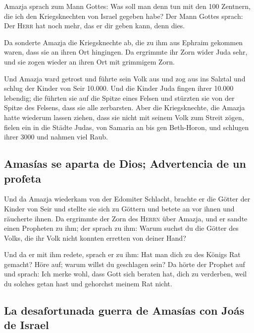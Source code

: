  Amazja sprach zum Mann Gottes: Was soll man denn tun mit
den 100 Zentnern, die ich den Kriegsknechten von Israel gegeben habe?
Der Mann Gottes sprach: Der \textsc{Herr} hat noch mehr, das er dir
geben kann, denn dies.

 Da sonderte Amazja die Kriegsknechte ab, die zu ihm aus
Ephraim gekommen waren, dass sie an ihren Ort hingingen. Da ergrimmte
ihr Zorn wider Juda sehr, und sie zogen wieder an ihren Ort mit
grimmigem Zorn.

 Und Amazja ward getrost und führte sein Volk aus und zog
aus ins Salztal und schlug der Kinder von Seir 10.000. 
Und die Kinder Juda fingen ihrer 10.000 lebendig; die führten sie auf
die Spitze eines Felsen und stürzten sie von der Spitze des Felsens,
dass sie alle zerbarsten.  Aber die Kriegsknechte, die
Amazja hatte wiederum lassen ziehen, dass sie nicht mit seinem Volk zum
Streit zögen, fielen ein in die Städte Judas, von Samaria an bis gen
Beth-Horon, und schlugen ihrer 3000 und nahmen viel Raub.

\hypertarget{amasuxedas-se-aparta-de-dios-advertencia-de-un-profeta}{%
\subsection{Amasías se aparta de Dios; Advertencia de un
profeta}\label{amasuxedas-se-aparta-de-dios-advertencia-de-un-profeta}}

 Und da Amazja wiederkam von der Edomiter Schlacht,
brachte er die Götter der Kinder von Seir und stellte sie sich zu
Göttern und betete an vor ihnen und räucherte ihnen.  Da
ergrimmte der Zorn des \textsc{Herrn} über Amazja, und er sandte einen
Propheten zu ihm; der sprach zu ihm: Warum suchst du die Götter des
Volks, die ihr Volk nicht konnten erretten von deiner Hand?

 Und da er mit ihm redete, sprach er zu ihm: Hat man dich
zu des Königs Rat gemacht? Höre auf; warum willst du geschlagen sein? Da
hörte der Prophet auf und sprach: Ich merke wohl, dass Gott sich beraten
hat, dich zu verderben, weil du solches getan hast und gehorchst meinem
Rat nicht.

\hypertarget{la-desafortunada-guerra-de-amasuxedas-con-jouxe1s-de-israel}{%
\subsection{La desafortunada guerra de Amasías con Joás de
Israel}\label{la-desafortunada-guerra-de-amasuxedas-con-jouxe1s-de-israel}}

